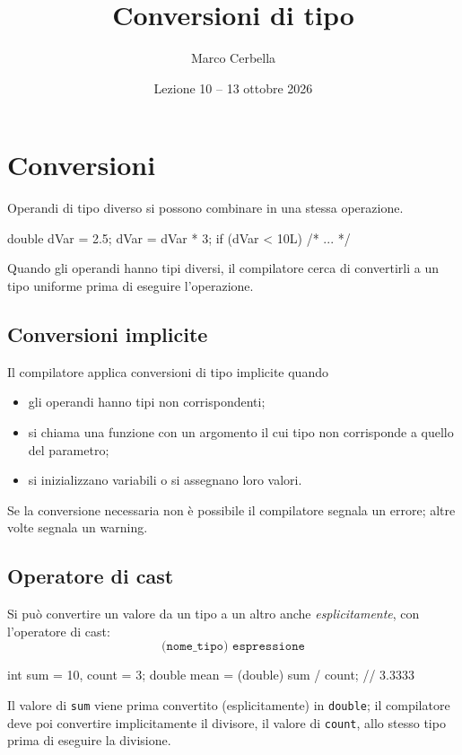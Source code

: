 \documentclass[11pt,a4paper]{article}
\title{Conversioni di tipo}
\author{Marco Cerbella}
\date{Lezione 10 -- 13 ottobre 2026}
\begin{document}
\maketitle

\section{Conversioni}

Operandi di tipo diverso si possono combinare in una stessa operazione.

\begin{codice}
double dVar = 2.5;
dVar = dVar * 3;
if (dVar < 10L) { /* ... */ }
\end{codice}

Quando gli operandi hanno tipi diversi, il compilatore cerca di convertirli a un tipo uniforme prima di eseguire l'operazione.

\subsection{Conversioni implicite}

Il compilatore applica conversioni di tipo implicite quando
\begin{itemize}
    \item gli operandi hanno tipi non corrispondenti;
    \item si chiama una funzione con un argomento il cui tipo non corrisponde a quello del parametro;
    \item si inizializzano variabili o si assegnano loro valori.
\end{itemize}
Se la conversione necessaria non è possibile il compilatore segnala un errore; altre volte segnala un warning.

\subsection{Operatore di cast}

Si può convertire un valore da un tipo a un altro anche \emph{esplicitamente}, con l'operatore di cast:
\[
\texttt{(nome\_tipo) espressione}
\]

\begin{codice}
int sum = 10, count = 3;
double mean = (double) sum / count;   // 3.3333
\end{codice}

Il valore di \lstinline|sum| viene prima convertito (esplicitamente) in \lstinline|double|; il compilatore deve poi convertire implicitamente il divisore, il valore di \lstinline|count|, allo stesso tipo prima di eseguire la divisione.
\end{document}
